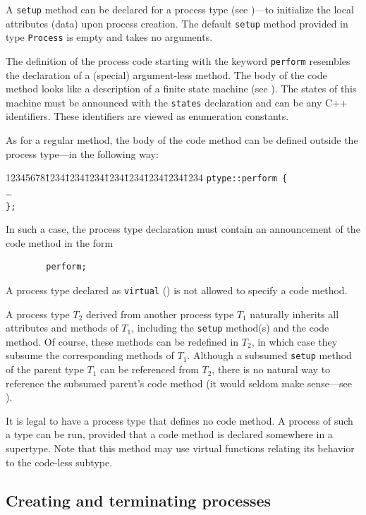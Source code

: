 A {\tt setup} method can be declared for a process type
(see )---to initialize the local attributes (data) upon
process creation.
The default {\tt setup} method provided in type {\tt Process} is empty
and takes no arguments.

The definition of the process code starting with the keyword
{\tt perform} resembles the declaration of a (special) argument-less method.
The body of the code method looks like a description of
a finite state machine (see ).
The states of this machine must be announced with the {\tt states} declaration
and can be any C++ identifiers.
These identifiers are viewed as enumeration constants.

As for a regular method,
the body of the code method can be defined outside the process type---in
the following way:
{\tt\begin{tabbing}
12345678\=1234\=1234\=1234\=1234\=1234\=1234\=1234\=1234\kill
\> {\tt ptype::perform \{} \\
\> \> \ldots \\
\> {\tt \};}
\end{tabbing}}
In such a case, the process type declaration must contain an announcement of
the code method in the form
\begin{verbatim}
        perform;
\end{verbatim}

A process type declared as {\tt virtual} () is not allowed to
specify a code method.

\medskip

A process type $T_2$ derived from another
process type $T_1$ naturally inherits all
attributes and methods of $T_1$, including the {\tt setup} method(s)
and the code method.
Of course, these methods can be redefined in $T_2$, in which case they
subsume the corresponding methods of $T_1$.
Although a subsumed
{\tt setup} method of the parent type $T_1$ can be referenced
from $T_2$, there is no natural way to reference the subsumed parent's code
method (it would seldom make sense---see ).

It is legal to have a process type that defines no code method.
A process of such a type can be run,
provided that a code method is declared somewhere in a supertype.
Note that this method may use virtual functions relating its behavior
to the code-less subtype.

\subsection{Creating and terminating processes}
\label{rm_pr_ct}

